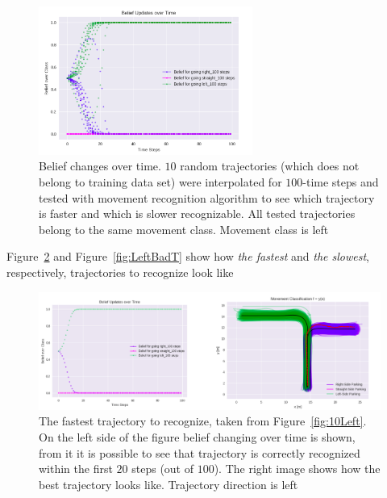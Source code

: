 \begin{figure}[H]
	\centering  	
	\includegraphics[width=7cm]{img/netLeftT.png}
	\caption{Belief changes over time. $10$ random trajectories (which does not belong to training data set) were interpolated for $100$-time steps and tested with movement recognition algorithm to see which trajectory is faster and which is slower recognizable. All tested trajectories belong to the same movement class. Movement class is left}
	\label{fig:10LeftsT}    
\end{figure}

Figure~\ref{fig:LeftGoodT} and Figure~\ref{fig:LeftBadT} show how \textit{the fastest} and \textit{the slowest}, respectively, trajectories to recognize look like 

\begin{figure}[H]
	\centering  	
	\includegraphics[width=13cm]{img/goodLeftT.png}
	\caption{The fastest trajectory to recognize, taken from Figure~\ref{fig:10Left}. On the left side of the figure belief changing over time is shown, from it it is possible to see that trajectory is correctly recognized within the first $20$ steps (out of $100$). The right image shows how the best trajectory looks like. Trajectory direction is left}
	\label{fig:LeftGoodT}    
\end{figure}

